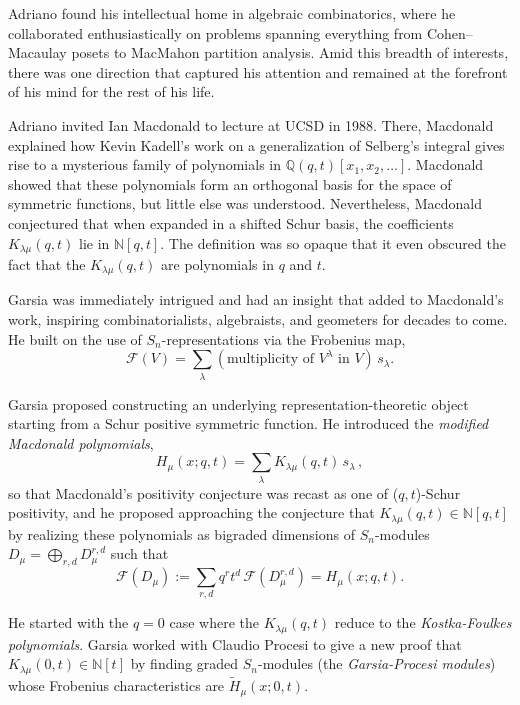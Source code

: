 \documentclass{amsart}
\begin{document}
Adriano found his intellectual home in algebraic combinatorics, where he collaborated enthusiastically on problems spanning everything from Cohen–Macaulay posets to MacMahon partition analysis. Amid this breadth of interests, there was one direction that captured his attention and remained at the forefront of his mind for the rest of his life.

Adriano invited Ian Macdonald to lecture at UCSD in 1988. There, Macdonald
explained how Kevin Kadell’s work on a generalization of Selberg’s
integral gives rise to a mysterious family of polynomials in
$\mathbb Q(q,t)[x_1,x_2,\ldots]$. Macdonald showed that these polynomials form an
orthogonal basis for the space of symmetric functions, but little else
was understood. Nevertheless, Macdonald conjectured that when expanded
in a shifted Schur basis, the coefficients $K_{\lambda\mu}(q,t)$ lie in
$\mathbb N[q,t]$. The definition was so opaque that it even obscured the
fact that the $K_{\lambda\mu}(q,t)$ are polynomials in $q$ and $t$.



Garsia was immediately intrigued and had an insight that added to
Macdonald's work, inspiring combinatorialists, algebraists, and
geometers for decades to come.  He built on the use of
$S_n$-representations via the Frobenius map,
\[
\mathcal F(V) = \sum_{\lambda}
(\text{multiplicity of } V^\lambda \text{ in } V)\, s_\lambda .
\]

Garsia proposed constructing an underlying representation-theoretic
object starting from a Schur positive symmetric function.
He introduced the {\it modified Macdonald polynomials},
\[
H_\mu(x;q,t) = \sum_{\lambda} K_{\lambda\mu}(q,t)\, s_\lambda \,,
\]
so that Macdonald’s positivity conjecture was recast as one
of ($q,t$)-Schur positivity, and he
proposed approaching
the conjecture that $K_{\lambda\mu}(q,t)\in \mathbb N[q,t]$
by realizing these polynomials as bigraded dimensions
of $S_n$-modules
$D_\mu=\bigoplus_{r,d} D_\mu^{r,d}$ such that
\begin{equation}
\label{e:FonD}
\mathcal F(D_\mu)
:= \sum_{r,d} q^r t^d\,\mathcal F(D_\mu^{r,d})
=
H_\mu(x;q,t).
\end{equation}

He started with the $q=0$ case where
the $K_{\lambda\mu}(q,t)$ reduce to the
\emph{Kostka-Foulkes polynomials}.
Garsia worked with Claudio Procesi to give a new
proof that $K_{\lambda\mu}(0,t)\in\mathbb N[t]$
by finding graded $S_n$-modules
(the {\it Garsia-Procesi modules})
whose Frobenius characteristics are $\tilde H_\mu(x;0,t)$.
\end{document}
